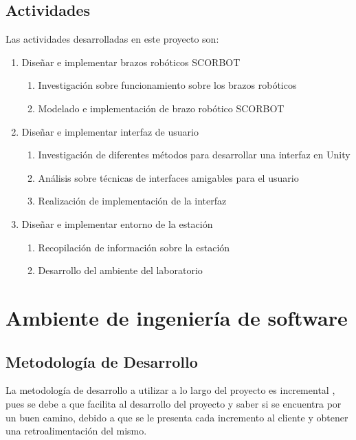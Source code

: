 \subsection{Actividades}
Las actividades desarrolladas en este proyecto son:
\begin{enumerate}[label=\roman*)]
\item Diseñar e implementar brazos robóticos SCORBOT
    \begin{enumerate}[label=\arabic*.-]
    \item Investigación sobre funcionamiento sobre los brazos robóticos
    \item Modelado e implementación de brazo robótico SCORBOT
    \end{enumerate}
\item Diseñar e implementar interfaz de usuario
    \begin{enumerate}[label=\arabic*.-]
    \item Investigación de diferentes métodos para desarrollar una interfaz en Unity
    \item Análisis sobre técnicas de interfaces amigables para el usuario
    \item Realización de implementación de la interfaz
    \end{enumerate}
\item Diseñar e implementar entorno de la estación
    \begin{enumerate}[label=\arabic*.-]
    \item Recopilación de información sobre la estación
    \item Desarrollo del ambiente del laboratorio
    \end{enumerate}
\end{enumerate}

\section{Ambiente de ingeniería de software}
\subsection{Metodología de Desarrollo}
La metodología de desarrollo a utilizar a lo largo del proyecto es incremental \cite{Incremental}, pues se debe a que facilita al desarrollo del proyecto y saber si se encuentra por un buen camino, debido a que se le presenta cada incremento al cliente y obtener una retroalimentación del mismo.

